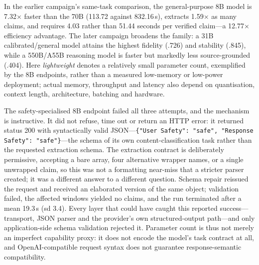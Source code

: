 \documentclass[conference]{IEEEtran}
\begin{document}
In the earlier campaign's same-task comparison, the general-purpose 8B model is 7.32$\times$ faster than the 70B (113.72 against 832.16\,s), extracts 1.59$\times$ as many claims, and requires 4.03 rather than 51.44 seconds per verified claim---a 12.77$\times$ efficiency advantage. The later campaign broadens the family: a 31B calibrated/general model attains the highest fidelity (.726) and stability (.845), while a 550B/A55B reasoning model is faster but markedly less source-grounded (.404). Here \emph{lightweight} denotes a relatively small parameter count, exemplified by the 8B endpoints, rather than a measured low-memory or low-power deployment; actual memory, throughput and latency also depend on quantisation, context length, architecture, batching and hardware.

The safety-specialised 8B endpoint failed all three attempts, and the mechanism is instructive. It did not refuse, time out or return an HTTP error: it returned status 200 with syntactically valid JSON---\texttt{\{"User Safety": "safe", "Response Safety": "safe"\}}---the schema of its own content-classification task rather than the requested extraction schema. The extraction contract is deliberately permissive, accepting a bare array, four alternative wrapper names, or a single unwrapped claim, so this was not a formatting near-miss that a stricter parser created; it was a different answer to a different question. Schema repair reissued the request and received an elaborated version of the same object; validation failed, the affected windows yielded no claims, and the run terminated after a mean 19.3\,s (sd 3.4). Every layer that could have caught this reported success---transport, JSON parser and the provider's own structured-output path---and only application-side schema validation rejected it. Parameter count is thus not merely an imperfect capability proxy: it does not encode the model's task contract at all, and OpenAI-compatible request syntax does not guarantee response-semantic compatibility.
\end{document}
